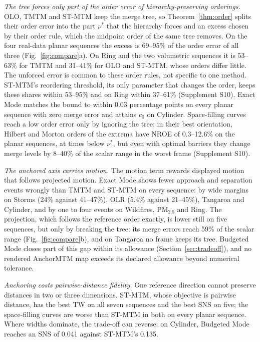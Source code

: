 \documentclass[review]{vgtc}
\begin{document}
\emph{The tree forces only part of the order error of hierarchy-preserving orderings.} OLO, TMTM and ST-MTM keep the merge tree, so Theorem~\ref{thm:order} splits their order error into the part $\nu^*$ that the hierarchy forces and an excess chosen by their order rule, which the midpoint order of the same tree removes. On the four real-data planar sequences the excess is 69--95\% of the order error of all three (Fig.~\ref{fig:compare}a). On Ring and the two volumetric sequences it is 53--63\% for TMTM and 31--41\% for OLO and ST-MTM, whose orders differ little. The unforced error is common to these order rules, not specific to one method. ST-MTM's reordering threshold, its only parameter that changes the order, keeps these shares within 53--95\% and on Ring within 37--61\% (Supplement S10). Exact Mode matches the bound to within 0.03 percentage points on every planar sequence with zero merge error and attains $c_0$ on Cylinder. Space-filling curves reach a low order error only by ignoring the tree: in their best orientation, Hilbert and Morton orders of the extrema have NROE of 0.3--12.6\% on the planar sequences, at times below $\nu^*$, but even with optimal barriers they change merge levels by 8--40\% of the scalar range in the worst frame (Supplement S10).

\emph{The anchored axis carries motion.} The motion term rewards displayed motion that follows projected motion. Exact Mode shows fewer approach and separation events wrongly than TMTM and ST-MTM on every sequence: by wide margins on Storms (24\% against 41--47\%), OLR (5.4\% against 21--45\%), Tangaroa and Cylinder, and by one to four events on Wildfires, PM$_{2.5}$ and Ring. The projection, which follows the reference order exactly, is lower still on five sequences, but only by breaking the tree: its merge errors reach 59\% of the scalar range (Fig.~\ref{fig:compare}b), and on Tangaroa no frame keeps its tree. Budgeted Mode closes part of this gap within its allowance (Section~\ref{sec:tradeoff}), and no rendered AnchorMTM map exceeds its declared allowance beyond numerical tolerance.

\emph{Anchoring costs pairwise-distance fidelity.} One reference direction cannot preserve distances in two or three dimensions. ST-MTM, whose objective is pairwise distance, has the best TW on all seven sequences and the best SNS on five; the space-filling curves are worse than ST-MTM in both on every planar sequence. Where widths dominate, the trade-off can reverse: on Cylinder, Budgeted Mode reaches an SNS of 0.041 against ST-MTM's 0.135.
\end{document}
